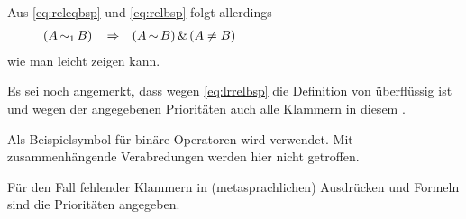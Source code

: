 Aus \eqref{eq:releqbsp} und \eqref{eq:relbsp} folgt allerdings
\begin{align}
	& (A \operatorname{\operatorname{\sim}_1} B) && \operatorname{\Rightarrow} & (A \operatorname{\sim} B) \operatorname{\operatorname{\&}\,} (A \ne B)
	\label{eq:relBsp} &&&&&&&&&&&&&&&&&&&&&&&&&&&&&&
\end{align}
wie man leicht zeigen kann.

Es sei noch angemerkt, dass wegen \eqref{eq:lrrelbsp} die Definition von \symqt{\metarep}  überflüssig ist und wegen der angegebenen Prioritäten  auch alle Klammern in diesem \sectionname.

Als Beispielsymbol für binäre Operatoren wird \symqt{\opbsp} verwendet.
Mit \symqt{\opbsp} zusammenhängende Verabredungen werden hier nicht getroffen.

Für den Fall fehlender Klammern in (metasprachlichen) Ausdrücken und Formeln sind die Prioritäten  angegeben.

